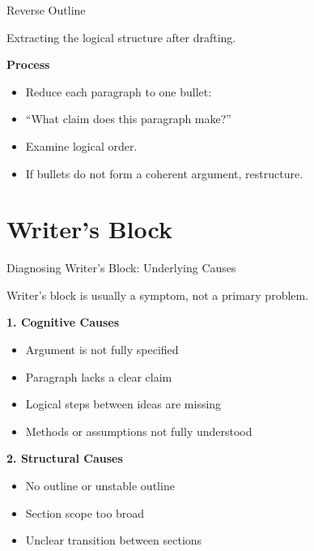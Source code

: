 \documentclass{beamer}
\begin{document}

\begin{frame}{Reverse Outline}


Extracting the logical structure after drafting.
\vspace{1em}


\textbf{Process}
\begin{itemize}
    \item Reduce each paragraph to one bullet:
    \item[] “What claim does this paragraph make?”
    \item Examine logical order.
    \item If bullets do not form a coherent argument, restructure.
\end{itemize}






\end{frame}

\section{Writer's Block}



\begin{frame}{Diagnosing Writer's Block: Underlying Causes}

Writer’s block is usually a symptom, not a primary problem.

\vspace{0.5em}

\textbf{1. Cognitive Causes}
\begin{itemize}
    \item Argument is not fully specified
    \item Paragraph lacks a clear claim
    \item Logical steps between ideas are missing
    \item Methods or assumptions not fully understood
\end{itemize}

\textbf{2. Structural Causes}
\begin{itemize}
    \item No outline or unstable outline
    \item Section scope too broad
    \item Unclear transition between sections
\end{itemize}


\end{frame}
\end{document}
